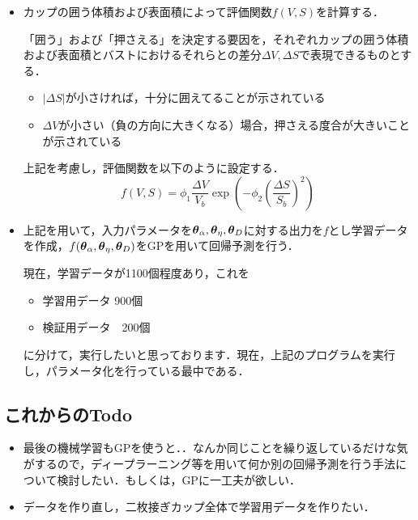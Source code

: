 \documentclass[11pt]{jsarticle}
\begin{document}
\begin{itemize}
				\item カップの囲う体積および表面積によって評価関数$ f(V,S) $を計算する．
				
				「囲う」および「押さえる」を決定する要因を，それぞれカップの囲う体積および表面積とバストにおけるそれらとの差分$\Delta V,\Delta S $で表現できるものとする．
				\begin{itemize}
					\item $ |\Delta S| $が小さければ，十分に囲えてることが示されている
					\item $ \Delta V $が小さい（負の方向に大きくなる）場合，押さえる度合が大きいことが示されている
				\end{itemize}
				上記を考慮し，評価関数を以下のように設定する．
				\begin{equation}\label{eq:EvalFunc}
					f(V,S) = \phi_1 \frac{\Delta V}{V_b} \exp \left(-\phi_2 \left(\frac{\Delta S}{S_b}\right)^2 \right)
				\end{equation}
				
				\item 上記を用いて，入力パラメータを$ \boldsymbol{\theta}_{\alpha},\boldsymbol{\theta}_{\eta},\boldsymbol{\theta}_{D} $に対する出力を$ f $とし学習データを作成，$ f(\boldsymbol{\theta}_{\alpha},\boldsymbol{\theta}_{\eta},\boldsymbol{\theta}_{D}) $をGPを用いて回帰予測を行う．
				
				現在，学習データが1100個程度あり，これを
				\begin{itemize}
					\item 学習用データ 900個
					\item 検証用データ　200個
				\end{itemize}
			に分けて，実行したいと思っております．現在，上記のプログラムを実行し，パラメータ化を行っている最中である．
			\end{itemize}
		\subsection{これからのTodo}
			\begin{itemize}
				\item 最後の機械学習もGPを使うと．．なんか同じことを繰り返しているだけな気がするので，ディープラーニング等を用いて何か別の回帰予測を行う手法について検討したい．もしくは，GPに一工夫が欲しい．
				\item データを作り直し，二枚接ぎカップ全体で学習用データを作りたい．
			\end{itemize}
			
	\newpage
\vspace{10cm}

\vspace{14cm}
	\articleSPRfour
	\articleSPRfive
\end{document}

